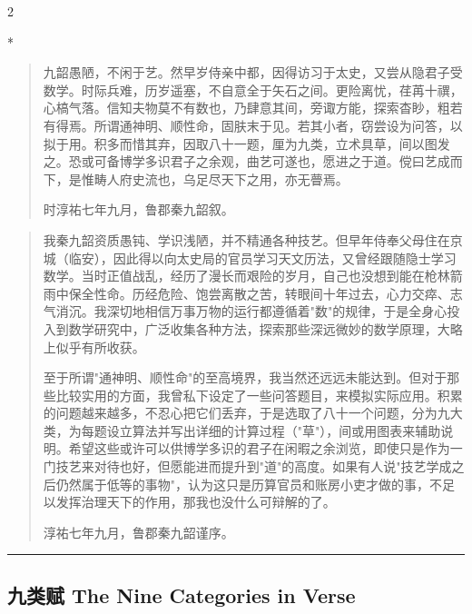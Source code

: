\documentclass[11pt,a4paper]{article}
\newenvironment{preface}{%
  \begin{quote}\color{prefacecolor}%
}{\end{quote}}
\newcommand{\zhtext}[1]{{\chinese #1}}
\begin{document}
\begin{paracol}{2}

\switchcolumn[0]*\begin{preface}
九韶愚陋，不闲于艺。然早岁侍亲中都，因得访习于太史，又尝从隐君子受数学。时际兵难，历岁遥塞，不自意全于矢石之间。更险离忧，荏苒十禩，心槁气落。信知夫物莫不有数也，乃肆意其间，旁诹方能，探索杳眇，粗若有得焉。所谓通神明、顺性命，固肤末于见。若其小者，窃尝设为问答，以拟于用。积多而惜其弃，因取八十一题，厘为九类，立术具草，间以图发之。恐或可备博学多识君子之余观，曲艺可遂也，愿进之于道。傥曰艺成而下，是惟畴人府史流也，乌足尽天下之用，亦无瞢焉。

时淳祐七年九月，鲁郡秦九韶叙。
\end{preface}

\switchcolumn\begin{quote}\small\color{prefacecolor}
我秦九韶资质愚钝、学识浅陋，并不精通各种技艺。但早年侍奉父母住在京城（临安），因此得以向太史局的官员学习天文历法，又曾经跟随隐士学习数学。当时正值战乱，经历了漫长而艰险的岁月，自己也没想到能在枪林箭雨中保全性命。历经危险、饱尝离散之苦，转眼间十年过去，心力交瘁、志气消沉。我深切地相信万事万物的运行都遵循着"数"的规律，于是全身心投入到数学研究中，广泛收集各种方法，探索那些深远微妙的数学原理，大略上似乎有所收获。

至于所谓"通神明、顺性命"的至高境界，我当然还远远未能达到。但对于那些比较实用的方面，我曾私下设定了一些问答题目，来模拟实际应用。积累的问题越来越多，不忍心把它们丢弃，于是选取了八十一个问题，分为九大类，为每题设立算法并写出详细的计算过程（"草"），间或用图表来辅助说明。希望这些或许可以供博学多识的君子在闲暇之余浏览，即使只是作为一门技艺来对待也好，但愿能进而提升到"道"的高度。如果有人说"技艺学成之后仍然属于低等的事物"，认为这只是历算官员和账房小吏才做的事，不足以发挥治理天下的作用，那我也没什么可辩解的了。

淳祐七年九月，鲁郡秦九韶谨序。
\end{quote}

\end{paracol}

\vspace{1em}
\noindent\textcolor{rulecolor}{\rule{\textwidth}{0.4pt}}
\vspace{0.5em}

\subsection{\zhtext{九类赋} The Nine Categories in Verse}
\end{document}
